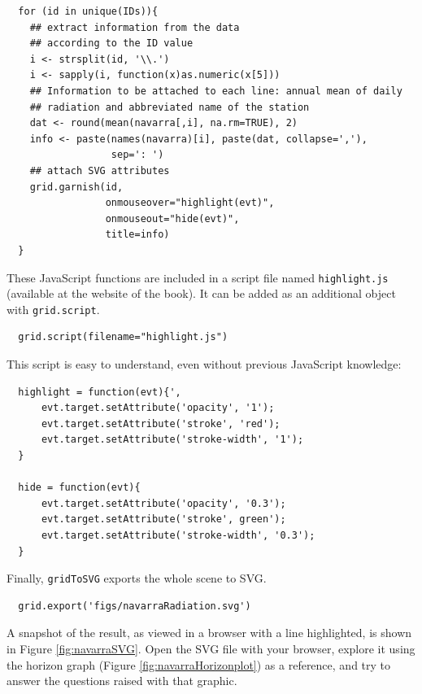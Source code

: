 \documentclass[smallroyalvopaper]{memoir}
\begin{document}
\lstset{language=r,label= ,caption= ,captionpos=b,numbers=none}
\begin{lstlisting}
  for (id in unique(IDs)){
    ## extract information from the data
    ## according to the ID value
    i <- strsplit(id, '\\.')
    i <- sapply(i, function(x)as.numeric(x[5]))
    ## Information to be attached to each line: annual mean of daily
    ## radiation and abbreviated name of the station
    dat <- round(mean(navarra[,i], na.rm=TRUE), 2)
    info <- paste(names(navarra)[i], paste(dat, collapse=','),
                  sep=': ')
    ## attach SVG attributes
    grid.garnish(id,
                 onmouseover="highlight(evt)",
                 onmouseout="hide(evt)",
                 title=info)
  }
\end{lstlisting}

These JavaScript functions are included in a script file named
\texttt{highlight.js} (available at the website of the book). It can be
added as an additional object with \texttt{grid.script}.


\lstset{language=r,label= ,caption= ,captionpos=b,numbers=none}
\begin{lstlisting}
  grid.script(filename="highlight.js")
\end{lstlisting}

This script is easy to understand, even without previous
JavaScript knowledge:
\begin{verbatim}
  highlight = function(evt){',
      evt.target.setAttribute('opacity', '1');
      evt.target.setAttribute('stroke', 'red');
      evt.target.setAttribute('stroke-width', '1');
  }
  
  hide = function(evt){
      evt.target.setAttribute('opacity', '0.3');
      evt.target.setAttribute('stroke', green');
      evt.target.setAttribute('stroke-width', '0.3');
  }
\end{verbatim}

Finally, \texttt{gridToSVG} exports the whole scene to SVG. 

\lstset{language=r,label= ,caption= ,captionpos=b,numbers=none}
\begin{lstlisting}
  grid.export('figs/navarraRadiation.svg')
\end{lstlisting}

A snapshot of the result, as viewed in a browser with a line
highlighted, is shown in Figure \ref{fig:navarraSVG}. Open the SVG
file with your browser, explore it using the horizon graph (Figure
\ref{fig:navarraHorizonplot}) as a reference, and try to answer the
questions raised with that graphic.
\end{document}
